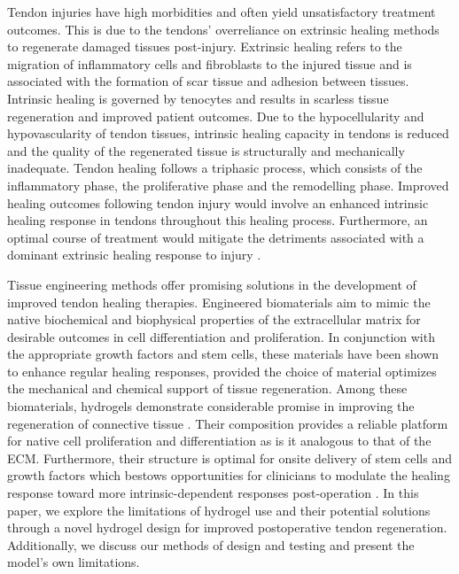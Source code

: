 Tendon injuries have high morbidities and often yield unsatisfactory treatment outcomes. This is due to the tendons' overreliance on extrinsic healing methods to regenerate damaged tissues post-injury. Extrinsic healing refers to the migration of inflammatory cells and fibroblasts to the injured tissue and is associated with the formation of scar tissue and adhesion between tissues. Intrinsic healing is governed by tenocytes and results in scarless tissue regeneration and improved patient outcomes. Due to the hypocellularity and hypovascularity of tendon tissues, intrinsic healing capacity in tendons is reduced and the quality of the regenerated tissue is structurally and mechanically inadequate. Tendon healing follows a triphasic process, which consists of the inflammatory phase, the proliferative phase and the remodelling phase. Improved healing outcomes following tendon injury would involve an enhanced intrinsic healing response in tendons throughout this healing process. Furthermore, an optimal course of treatment would mitigate the detriments associated with a dominant extrinsic healing response to injury \autocite{intro}.

Tissue engineering methods offer promising solutions in the development of improved tendon healing therapies. Engineered biomaterials aim to mimic the native biochemical and biophysical properties of the extracellular matrix for desirable outcomes in cell differentiation and proliferation. In conjunction with the appropriate growth factors and stem cells, these materials have been shown to enhance regular healing responses, provided the choice of material optimizes the mechanical and chemical support of tissue regeneration. Among these biomaterials, hydrogels demonstrate considerable promise in improving the regeneration of connective tissue \autocite{intro2}. Their composition provides a reliable platform for native cell proliferation and differentiation as is it analogous to that of the ECM. Furthermore, their structure is optimal for onsite delivery of stem cells and growth factors which bestows opportunities for clinicians to modulate the healing response toward more intrinsic-dependent responses post-operation \autocite{intro}. In this paper, we explore the limitations of hydrogel use and their potential solutions through a novel hydrogel design for improved postoperative tendon regeneration. Additionally, we discuss our methods of design and testing and present the model's own limitations.